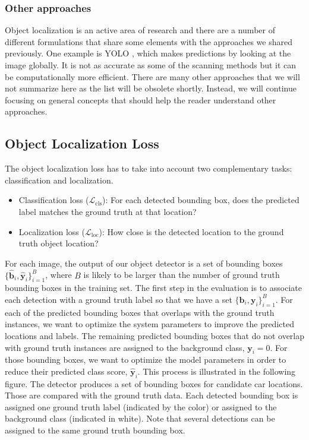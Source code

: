 \subsubsection{Other approaches}
Object localization is an active area of research and there are a number of different formulations that share some elements with the approaches we shared previously. One example is YOLO \cite{Redmon2016}, which makes predictions by looking at the image globally. It is not as accurate as some of the scanning methods but it can be computationally more efficient. There are many other approaches that we will not summarize here as the list will be obsolete shortly. Instead, we will continue focusing on general concepts that should help the reader understand other approaches.

\subsection{Object Localization Loss}

The object localization loss has to take into account two complementary tasks: classification and localization.
\begin{itemize}
    \item Classification loss ($\mathcal{L}_{\text{cls}}$): For each detected bounding box, does the predicted label matches the ground truth at that location?
    \item Localization loss ($\mathcal{L}_{\text{loc}}$): How close is the detected location to the ground truth object location?
\end{itemize}

For each image, the output of our object detector is a set of bounding boxes $\{\hat{\mathbf{b}}_i, \hat{\mathbf{y}}_i\}_{i=1}^B$, where $B$ is likely to be larger than the number of ground truth bounding boxes in the training set. The first step in the evaluation is to associate each detection with a ground truth label so that we have a set $\{\mathbf{b}_i, \mathbf{y}_i\}_{i=1}^B$. For each of the predicted bounding boxes that overlaps with the ground truth instances, we want to optimize the system parameters to improve the predicted locations and labels. The remaining predicted bounding boxes that do not overlap with ground truth instances are assigned to the background class, $\mathbf{y}_i=0$. For those bounding boxes, we want to optimize the model parameters in order to reduce their predicted class score, $\hat{\mathbf{y}}_i$. This process is illustrated in the following figure. The detector produces a set of bounding boxes for candidate car locations. Those are compared with the ground truth data. Each detected bounding box is assigned one ground truth label (indicated by the color) or assigned to the background class (indicated in white). Note that several detections can be assigned to the same ground truth bounding box.

